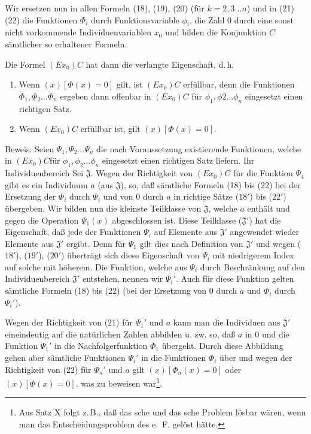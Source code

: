 \documentclass[draft]{scrartcl}
\begin{document}
Wir ersetzen nun in allen Formeln (18), (19), (20) (für $k = 2, 3 \dots n$) und in (21) (22) die Funktionen $\Phi_i$ durch Funktionsvariable
$\phi_i$, die Zahl $0$ durch eine sonst nicht vorkommende 
Individuenvariablen $x_0$ und bilden die Konjunktion $C$ sämtlicher so erhaltener Formeln.

Die Formel $\left(Ex_0\right) C$ hat dann die verlangte Eigenschaft, d.\,h.

\begin{enumerate}
	\item Wenn $\left(x\right)\left[\Phi\left(x\right) = 0\right]$ gilt, ist $\left(Ex_0\right)C$ erfüllbar, denn die Funktionen $\Phi_1, \Phi_2 \dots \Phi_n$ ergeben dann offenbar in $\left(Ex_0\right)C$ für $\phi_1, \phi2 \dots \phi_n$ eingesetzt einen richtigen Satz.
	\item Wenn $\left(Ex_0\right)C$ erfüllbar ist, gilt $\left(x\right)\left[\Phi\left(x\right) = 0\right]$.
\end{enumerate}

Beweis: Seien $\Psi_1, \Psi_2 \dots \Psi_n$ die nach Voraussetzung
existierende Funktionen, welche in $\left(Ex_0\right)C$für 
$\phi_1, \phi_2 \dots \phi_n$ eingesetzt einen richtigen Satz liefern.
Ihr Individuenbereich Sei $\mathfrak{J}$. Wegen der Richtigkeit von 
$\left(Ex_0\right)C$ für die Funktion $\Psi_4$ gibt es ein Individuum $a$ 
(aus $\mathfrak{J}$), so, daß sämtliche Formeln (18) bis (22) 
bei der Ersetzung der $\Phi_i$ durch $\Psi_i$ und von 0 durch $a$ 
in richtige Sätze ($18'$) bis ($22'$) übergeben. Wir bilden nun 
die kleinste Teilklasse von $\mathfrak{J}$, welche $a$ enthält 
und gegen die Operation $\Psi_1\left(x\right)$ abgeschlossen ist. 
Diese Teilklasse ($\mathfrak{J}'$) hat die Eigenschaft, daß 
jede der Funktionen $\Psi_i$ auf Elemente aus $\mathfrak{J}'$ 
angewendet wieder Elemente aus $\mathfrak{J}'$ ergibt. 
Denn für $\Psi_1$ gilt dies nach Definition von $\mathfrak{J}'$ 
und wegen ($18'$), ($19'$), ($20'$) überträgt sich diese 
Eigenschaft von $\Psi_i$ mit niedrigerem Index auf solche mit höherem.
Die Funktion, welche aus $\Psi_i$ durch Beschränkung auf den 
Individuenbereich $\mathfrak{J}'$ entstehen, nennen wir
$\Psi_i'$. Auch für diese Funktion gelten sämtliche Formeln 
(18) bis (22) (bei der  Ersetzung von 0 durch $a$ und $\Phi_i$ durch $\Psi_i'$).

Wegen der Richtigkeit von (21) für $\Psi_1'$ und $a$ kann man die Individuen aus $\mathfrak{J}'$ eineindeutig auf die natürlichen Zahlen abbilden u. zw. so, daß $a$ in $0$ und die Funktion $\Psi_1'$ in die Nachfolgerfunktion $\Phi_1$ übergeht. Durch diese Abbildung gehen aber sämtliche Funktionen $\Psi_i'$ in die Funktionen $\Phi_i$ über und wegen der Richtigkeit von (22) für $\Psi_n'$ und $a$ gilt $\left(x\right)\left[\Phi_n\left(x\right) = 0\right]$ oder $\left(x\right)\left[\Phi\left(x\right) = 0\right]$, was zu beweisen war\footnote{Aus Satz X folgt z.\,B., daß das sche und das sche Problem lösbar wären, wenn man das Entscheidungsproblem des e.~F. gelöst hätte.}.
\end{document}

